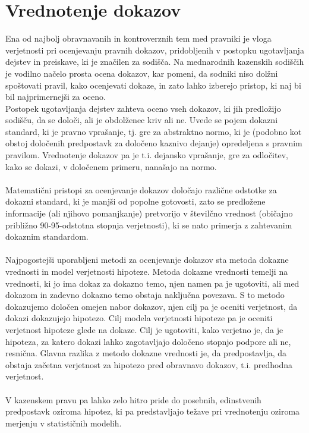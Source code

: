 \documentclass[12pt,a4paper]{amsart}
\theoremstyle{definition} %
\theoremstyle{plain} %
\begin{document}
\section{Vrednotenje dokazov}
Ena od najbolj obravnavanih in kontroverznih tem med pravniki je vloga verjetnosti pri ocenjevanju pravnih dokazov, pridobljenih v postopku 
ugotavljanja dejstev in preiskave, ki je značilen za sodišča. Na mednarodnih kazenskih sodiščih je vodilno načelo prosta ocena dokazov, kar pomeni, 
da sodniki niso dolžni spoštovati pravil, kako ocenjevati dokaze, in zato lahko izberejo pristop, ki naj bi bil najprimernejši za oceno.\\
Postopek ugotavljanja dejstev zahteva oceno vseh dokazov, ki jih predložijo sodišču, da se določi, ali je obdolženec kriv 
ali ne. Uvede se pojem dokazni standard, ki je pravno vprašanje, tj. gre za abstraktno normo, ki je (podobno kot obstoj določenih predpostavk za 
določeno kaznivo dejanje) opredeljena s pravnim pravilom. Vrednotenje dokazov pa je t.i. dejansko vprašanje, gre za odločitev, kako se dokazi, v določenem 
primeru, nanašajo na normo. \\\\
Matematični pristopi za ocenjevanje dokazov določajo različne odstotke za dokazni standard, ki je manjši od popolne gotovosti, zato se 
predložene informacije (ali njihovo pomanjkanje) pretvorijo v številčno vrednost (običajno približno 90-95-odstotna stopnja verjetnosti), ki se nato 
primerja z zahtevanim dokaznim standardom.\\\\
Najpogostejši uporabljeni metodi za ocenjevanje dokazov sta metoda dokazne vrednosti in model verjetnosti hipoteze. Metoda dokazne vrednosti temelji na vrednosti, ki 
jo ima dokaz za dokazno temo, njen namen pa je ugotoviti, ali med dokazom in zadevno dokazno temo obstaja naključna povezava. S to metodo dokazujemo 
določen omejen nabor dokazov, njen cilj pa je oceniti verjetnost, da dokazi dokazujejo hipotezo. Cilj modela 
verjetnosti hipoteze pa je oceniti verjetnost hipoteze glede na dokaze. Cilj je ugotoviti, kako verjetno je, da je hipoteza, za katero dokazi 
lahko zagotavljajo določeno stopnjo podpore ali ne, resnična. Glavna razlika z metodo dokazne vrednosti je, da predpostavlja, da obstaja začetna 
verjetnost za hipotezo pred obravnavo dokazov, t.i. predhodna verjetnost.\\\\
V kazenskem pravu pa lahko zelo hitro pride do posebnih, edinstvenih predpostavk oziroma hipotez, ki pa predstavljajo težave pri vrednotenju oziroma 
merjenju v statističnih modelih. 
\end{document}
